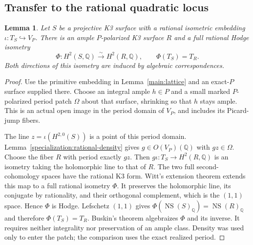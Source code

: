 \documentclass[11pt]{amsart}
\newcommand{\Q}{\mathbb Q}
\DeclareMathOperator{\NS}{NS}
\newtheorem{lemma}[theorem]{Lemma}
\theoremstyle{definition}
\theoremstyle{remark}
\numberwithin{equation}{section}
\begin{document}
\subsection{Transfer to the rational quadratic locus}

\begin{lemma}\label{transfer:period}
Let $S$ be a projective K3 surface with a rational isometric embedding
$\iota:T_S\hookrightarrow V_P$.  There is an ample $P$-polarized K3
surface $R$ and a full rational Hodge isometry
\[
 \Phi:H^2(S,\Q)\xrightarrow{\sim}H^2(R,\Q),\qquad
 \Phi(T_S)=T_R.
\]
Both directions of this isometry are induced by algebraic correspondences.
\end{lemma}
\begin{proof}
Use the primitive embedding in Lemma~\ref{main:lattice} and an exact-$P$
surface supplied there.  Choose an integral ample $h\in P$ and a small
marked $P$-polarized period patch $\Omega$ about that surface, shrinking
so that $h$ stays ample.  This is an actual open image in the period
domain of $V_P$, and includes its Picard-jump fibers.

The line $z=\iota(H^{2,0}(S))$ is a point of this period domain.
Lemma~\ref{specialization:rational-density} gives $g\in O(V_P)(\Q)$
with $gz\in\Omega$.  Choose the fiber $R$ with period exactly $gz$.
Then $g\iota:T_S\to H^2(R,\Q)$ is an isometry taking the holomorphic
line to that of $R$.  The two full second-cohomology spaces have the
rational K3 form.  Witt's extension theorem extends this map to a
full rational isometry $\Phi$.  It preserves the holomorphic line,
its conjugate by rationality, and their orthogonal complement, which
is the $(1,1)$ space.  Hence $\Phi$ is Hodge.  Lefschetz $(1,1)$ gives
$\Phi(\NS(S)_{\Q})=\NS(R)_{\Q}$ and therefore $\Phi(T_S)=T_R$.
Buskin's theorem \cite[Theorem~1.1]{Buskin} algebraizes $\Phi$ and its
inverse.  It requires neither integrality nor preservation of an ample
class.  Density was used only to enter the patch; the comparison uses
the exact realized period.
\end{proof}
\end{document}

